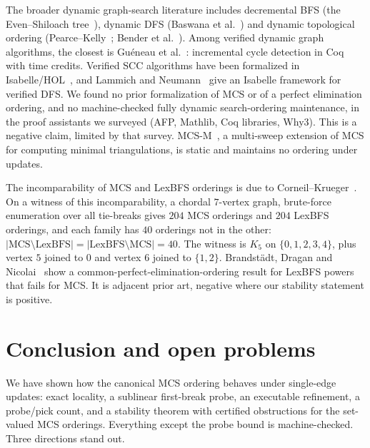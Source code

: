 \documentclass[11pt]{article}
\theoremstyle{definition}
\theoremstyle{remark}
\newcommand{\mcso}{\mathrm{MCS}}
\begin{document}
The broader dynamic graph-search literature includes decremental BFS (the
Even--Shiloach tree~\cite{even1981maintaining}), dynamic DFS (Baswana et
al.~\cite{baswana2019dynamic}) and dynamic topological
ordering (Pearce--Kelly~\cite{pearce2007dynamic}; Bender et
al.~\cite{bender2016new}). Among verified dynamic graph algorithms,
the closest is Gu\'eneau et al.~\cite{gueneau2019formal}: incremental cycle
detection in Coq with time credits. Verified SCC algorithms have been formalized
in Isabelle/HOL~\cite{lammich2014gabow}, and Lammich and
Neumann~\cite{lammich2015dfs} give an Isabelle framework for verified DFS. We
found no prior formalization of MCS or of a perfect elimination ordering, and no
machine-checked fully dynamic search-ordering maintenance, in the proof
assistants we surveyed (AFP, Mathlib, Coq libraries, Why3). This is a negative
claim, limited by that survey. MCS-M~\cite{berry2004mcs}, a multi-sweep
extension of MCS for computing minimal triangulations, is static and maintains
no ordering under updates.

The incomparability of MCS and LexBFS orderings is due to
Corneil--Krueger~\cite{corneil2008unified}. On a witness of this
incomparability, a chordal $7$-vertex graph, brute-force enumeration over all
tie-breaks gives $204$ MCS orderings and $204$ LexBFS orderings, and each family
has $40$ orderings not in the other:
$|\mcso\setminus\mathrm{LexBFS}|=|\mathrm{LexBFS}\setminus\mcso|=40$. The witness
is $K_5$ on $\{0,1,2,3,4\}$, plus vertex $5$ joined to $0$ and vertex $6$ joined
to $\{1,2\}$. Brandst\"adt, Dragan and Nicolai~\cite{brandstadt1997lexbfs} show a
common-perfect-elimination-ordering result for LexBFS powers that fails for MCS.
It is adjacent prior art, negative where our stability statement is positive.

\section{Conclusion and open problems}
\label{sec:conclusion}

We have shown how the canonical MCS ordering behaves under single-edge updates:
exact locality, a sublinear first-break probe, an executable refinement, a
probe/pick count, and a stability theorem with certified obstructions for the
set-valued MCS orderings. Everything except the probe bound is machine-checked. Three
directions stand out.
\end{document}
